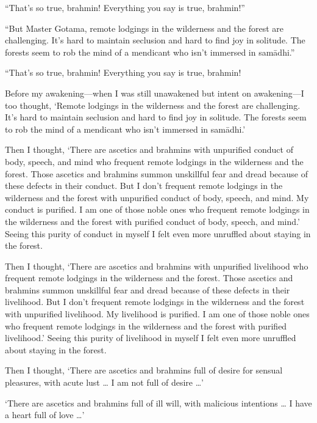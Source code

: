 \documentclass[12pt,openany]{book}%
\begin{document}
“That’s so true, brahmin! Everything you say is true, brahmin!” 

“But Master Gotama, remote lodgings in the wilderness and the forest are challenging. It’s hard to maintain seclusion and hard to find joy in solitude. The forests seem to rob the mind of a mendicant who isn’t immersed in \textsanskrit{samādhi}.” 

“That’s so true, brahmin! Everything you say is true, brahmin! 

Before my awakening—when I was still unawakened but intent on awakening—I too thought, ‘Remote lodgings in the wilderness and the forest are challenging. It’s hard to maintain seclusion and hard to find joy in solitude. The forests seem to rob the mind of a mendicant who isn’t immersed in \textsanskrit{samādhi}.’ 

Then I thought, ‘There are ascetics and brahmins with unpurified conduct of body, speech, and mind who frequent remote lodgings in the wilderness and the forest. Those ascetics and brahmins summon unskillful fear and dread because of these defects in their conduct. But I don’t frequent remote lodgings in the wilderness and the forest with unpurified conduct of body, speech, and mind. My conduct is purified. I am one of those noble ones who frequent remote lodgings in the wilderness and the forest with purified conduct of body, speech, and mind.’ Seeing this purity of conduct in myself I felt even more unruffled about staying in the forest. 

Then I thought, ‘There are ascetics and brahmins with unpurified livelihood who frequent remote lodgings in the wilderness and the forest. Those ascetics and brahmins summon unskillful fear and dread because of these defects in their livelihood. But I don’t frequent remote lodgings in the wilderness and the forest with unpurified livelihood. My livelihood is purified. I am one of those noble ones who frequent remote lodgings in the wilderness and the forest with purified livelihood.’ Seeing this purity of livelihood in myself I felt even more unruffled about staying in the forest. 

Then I thought, ‘There are ascetics and brahmins full of desire for sensual pleasures, with acute lust … I am not full of desire …’ 

‘There are ascetics and brahmins full of ill will, with malicious intentions … I have a heart full of love …’ 
\end{document}
